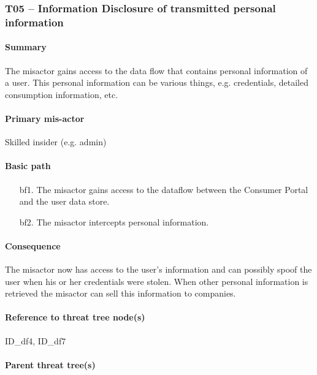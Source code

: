 \subsubsection{T05 -- Information Disclosure of transmitted personal information}
\label{threats:t05}

\paragraph{Summary}

\npar The misactor gains access to the data flow that contains personal
information of a user. This personal information can be various things, e.g.
credentials, detailed consumption information, etc.

\paragraph{Primary mis-actor}

\npar Skilled insider (e.g. admin)

\paragraph{Basic path}
\begin{enumerate}
	\item[bf1.] The misactor gains access to the dataflow between the Consumer
	Portal and the user data store.
    \item[bf2.] The misactor intercepts personal information.
\end{enumerate}

\paragraph{Consequence}

\npar The misactor now has access to the user's information and can possibly
spoof the user when his or her credentials were stolen. When other personal
information is retrieved the misactor can sell this information to companies.

\paragraph{Reference to threat tree node(s)}

ID\_df4, ID\_df7

\paragraph{Parent threat tree(s)}


